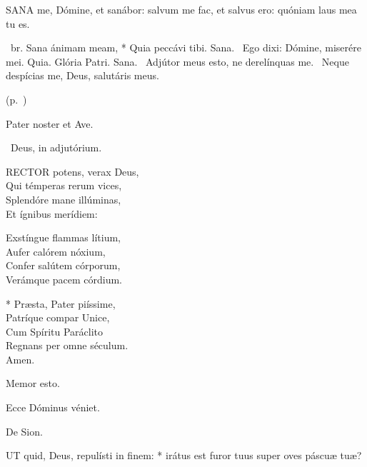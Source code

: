 


\lettrine[lines=2]{S}{ANA} me, Dómine, et sanábor: salvum me fac, et salvus ero: quóniam laus mea tu es.

\R\ br. Sana ánimam meam, * Quia peccávi tibi. Sana. \V\ Ego dixi: Dómine, miserére mei. Quia. Glória Patri. Sana. \V\ Adjútor meus esto, ne derelínquas me. \R\ Neque despícias me, Deus, salutáris meus.

 (p.~\pageref{feria5:precesferialester})


\sectionornament


Pater noster et Ave.

\V\ Deus, in adjutórium.


\lettrine[lines=2]{R}{ECTOR} potens, verax Deus,\\
Qui témperas rerum vices,\\
Splendóre mane illúminas,\\
Et ígnibus merídiem:

Exstíngue flammas lítium,\\
Aufer calórem nóxium,\\
Confer salútem córporum,\\
Verámque pacem córdium.

* Præsta, Pater piíssime,\\
Patríque compar Unice,\\
Cum Spíritu Paráclito\\
Regnans per omne séculum.\\
Amen.

  Memor esto.


  Ecce Dóminus véniet.

  De Sion.


\lettrine[lines=2]{U}{T} quid, Deus, repulísti in finem: * irátus est furor tuus super oves páscuæ tuæ?

